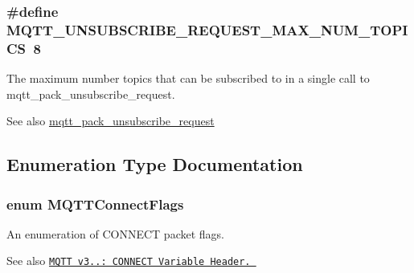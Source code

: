 \subsubsection[{\texorpdfstring{M\+Q\+T\+T\+\_\+\+U\+N\+S\+U\+B\+S\+C\+R\+I\+B\+E\+\_\+\+R\+E\+Q\+U\+E\+S\+T\+\_\+\+M\+A\+X\+\_\+\+N\+U\+M\+\_\+\+T\+O\+P\+I\+CS}{MQTT_UNSUBSCRIBE_REQUEST_MAX_NUM_TOPICS}}]{\setlength{\rightskip}{0pt plus 5cm}\#define M\+Q\+T\+T\+\_\+\+U\+N\+S\+U\+B\+S\+C\+R\+I\+B\+E\+\_\+\+R\+E\+Q\+U\+E\+S\+T\+\_\+\+M\+A\+X\+\_\+\+N\+U\+M\+\_\+\+T\+O\+P\+I\+CS~8}\hypertarget{group__packers_gaff4017b7a1668b6ad6e0d006d0fdf10e}{}\label{group__packers_gaff4017b7a1668b6ad6e0d006d0fdf10e}


The maximum number topics that can be subscribed to in a single call to mqtt\+\_\+pack\+\_\+unsubscribe\+\_\+request. 

\begin{DoxySeeAlso}{See also}
\hyperlink{group__packers_ga3a0e5c05084d708f16cb1a244cbcaad5}{mqtt\+\_\+pack\+\_\+unsubscribe\+\_\+request} 
\end{DoxySeeAlso}


\subsection{Enumeration Type Documentation}
\subsubsection[{\texorpdfstring{M\+Q\+T\+T\+Connect\+Flags}{MQTTConnectFlags}}]{\setlength{\rightskip}{0pt plus 5cm}enum {\bf M\+Q\+T\+T\+Connect\+Flags}}\hypertarget{group__packers_gad6fa84a96a940fe4eae6ffca1a6d945f}{}\label{group__packers_gad6fa84a96a940fe4eae6ffca1a6d945f}


An enumeration of C\+O\+N\+N\+E\+CT packet flags. 

\begin{DoxySeeAlso}{See also}
\href{http://docs.oasis-open.org/mqtt/mqtt/v3.1.1/os/mqtt-v3.1.1-os.html#_Toc398718030}{\tt M\+Q\+TT v3..\+: C\+O\+N\+N\+E\+CT Variable Header. } 
\end{DoxySeeAlso}

